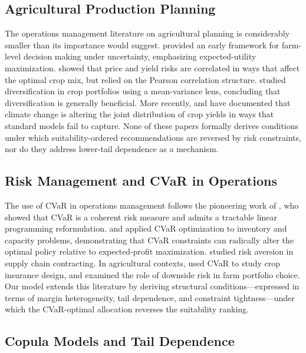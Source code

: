 \documentclass[12pt,review,authoryear]{elsarticle}
\numberwithin{equation}{section}
\begin{document}
\subsection*{Agricultural Production Planning}

The operations management literature on agricultural planning is
considerably smaller than its importance would suggest.
\citet{Hardaker2004} provided an early framework for farm-level decision
making under uncertainty, emphasizing expected-utility maximization.
\citet{Ramirez2003} showed that price and yield risks are correlated in
ways that affect the optimal crop mix, but relied on the Pearson
correlation structure.  \citet{Chavas2001} studied diversification in
crop portfolios using a mean-variance lens, concluding that diversification
is generally beneficial.  More recently, \citet{Finger2018} and
\citet{Barnhill2022} have documented that climate change is altering the
joint distribution of crop yields in ways that standard models fail to
capture.  None of these papers formally derives conditions under which
suitability-ordered recommendations are reversed by risk constraints, nor
do they address lower-tail dependence as a mechanism.

\subsection*{Risk Management and CVaR in Operations}

The use of CVaR in operations management follows the pioneering work of
\citet{RockafellarUryasev2000,RockafellarUryasev2002}, who showed that
CVaR is a coherent risk measure and admits a tractable linear programming
reformulation.  \citet{Chen2009} and \citet{Gotoh2007} applied CVaR
optimization to inventory and capacity problems, demonstrating that CVaR
constraints can radically alter the optimal policy relative to
expected-profit maximization.  \citet{Choi2011} studied risk aversion in
supply chain contracting.  In agricultural contexts, \citet{Gao2016}
used CVaR to study crop insurance design, and \citet{Blank2001} examined
the role of downside risk in farm portfolio choice.  Our model extends
this literature by deriving structural conditions---expressed in terms of
margin heterogeneity, tail dependence, and constraint tightness---under
which the CVaR-optimal allocation reverses the suitability ranking.

\subsection*{Copula Models and Tail Dependence}
\end{document}
